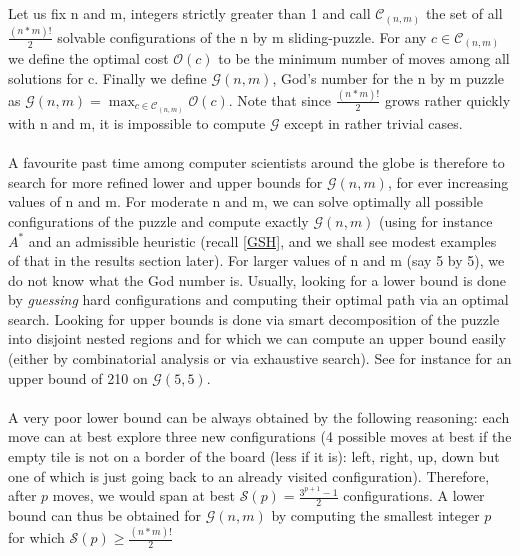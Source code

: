 Let us fix n and m, integers strictly greater than 1 and call $\mathcal{C}_{(n, m)}$ the set of all $\frac{(n * m)!}{2}$ solvable configurations of the n by m sliding-puzzle. For any $c \in \mathcal{C}_{(n, m)}$ we define the optimal cost $\mathcal{O}(c)$ to be the minimum number of moves among all solutions for c. Finally we define $\mathcal{G}(n, m)$, God's number for the n by m puzzle as  $\mathcal{G}(n, m) = \max_{c \in \mathcal{C}_{(n, m)}} \mathcal{O}(c)$. Note that since $\frac{(n * m)!}{2}$ grows rather quickly with n and m, it is impossible to compute $\mathcal{G}$ except in rather trivial cases.
\\
\\
A favourite past time among computer scientists around the globe is therefore to search for more refined lower and upper bounds for $\mathcal{G}(n, m)$, for ever increasing values of n and m. For moderate n and m, we can solve optimally all possible configurations of the puzzle and compute exactly $\mathcal{G}(n, m)$  (using for instance $A^{*}$ and an admissible heuristic (recall \ref{GSH}, and we shall see modest examples of that in the results section later). For larger values of n and m (say 5 by 5), we do not know what the God number is. Usually, looking for a lower bound is done by \textit{guessing} hard configurations and computing their optimal path via an optimal search. Looking for upper bounds is done via smart decomposition of the puzzle into disjoint nested regions and for which we can compute an upper bound easily (either by combinatorial analysis or via exhaustive search). See for instance \cite{KarlemoOstergard} for an upper bound of 210 on $\mathcal{G}(5, 5)$.
\\
\\
A very poor lower bound can be always obtained by the following reasoning: each move can at best explore three new configurations (4 possible moves at best if the empty tile is not on a border of the board (less if it is): left, right, up, down but one of which is just going back to an already visited configuration). Therefore, after $p$ moves, we would span at best $\mathcal{S}(p) = \frac{3^{p+1} - 1}{2}$ configurations. A lower bound can thus be obtained for $\mathcal{G}(n, m)$ by computing the smallest integer $p$ for which $\mathcal{S}(p) \ge \frac{(n * m)!}{2}$





